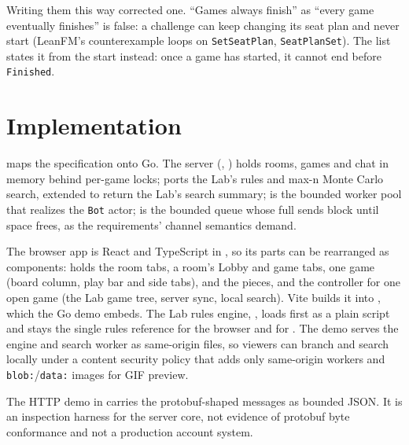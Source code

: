 \documentclass[11pt,oneside]{book}
\begin{document}
Writing them this way corrected one. ``Games always finish'' as ``every game
eventually finishes'' is false: a challenge can keep changing its seat plan and
never start (LeanFM's counterexample loops on \texttt{SetSeatPlan},
\texttt{SeatPlanSet}). The list states it from the start instead: once a game
has started, it cannot end before \texttt{Finished}.

\chapter{Implementation}
 maps the specification onto Go. The server
(, ) holds rooms, games and chat in
memory behind per-game locks;  ports the Lab's rules and
max-n Monte Carlo search, extended to return the Lab's search summary;
 is the bounded worker pool that realizes the \texttt{Bot}
actor;  is the bounded queue whose full sends block
until space frees, as the requirements' channel semantics demand.

The browser app is React and TypeScript in , so its parts can be
rearranged as components:  holds the room tabs,  a
room's Lobby and game tabs,  one game (board column, play bar and
side tabs),  and  the pieces, and
 the controller for one open game (the Lab game tree, server
sync, local search). Vite builds it into ,
which the Go demo embeds. The Lab rules engine, , loads
first as a plain script and stays the single rules reference for the browser
and for . The demo serves the engine and search worker as
same-origin files, so viewers can branch and search locally under a content
security policy that adds only same-origin workers and
\texttt{blob:}/\texttt{data:} images for GIF preview.

The HTTP demo in  carries the protobuf-shaped messages
as bounded JSON. It is an inspection harness for the server core, not evidence
of protobuf byte conformance and not a production account system.
\end{document}
